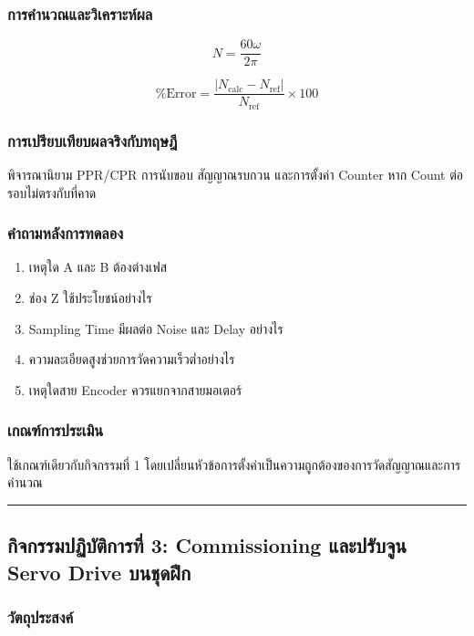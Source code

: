 \subsubsection{การคำนวณและวิเคราะห์ผล}

\[
N=\frac{60\omega}{2\pi}
\]

\[
\%\text{Error}
=
\frac{|N_{\text{calc}}-N_{\text{ref}}|}{N_{\text{ref}}}\times100
\]

\subsubsection{การเปรียบเทียบผลจริงกับทฤษฎี}

พิจารณานิยาม PPR/CPR การนับขอบ สัญญาณรบกวน และการตั้งค่า Counter หาก Count ต่อรอบไม่ตรงกับที่คาด

\subsubsection{คำถามหลังการทดลอง}

\begin{enumerate}
    \item เหตุใด A และ B ต้องต่างเฟส
    \item ช่อง Z ใช้ประโยชน์อย่างไร
    \item Sampling Time มีผลต่อ Noise และ Delay อย่างไร
    \item ความละเอียดสูงช่วยการวัดความเร็วต่ำอย่างไร
    \item เหตุใดสาย Encoder ควรแยกจากสายมอเตอร์
\end{enumerate}

\subsubsection{เกณฑ์การประเมิน}

ใช้เกณฑ์เดียวกับกิจกรรมที่ 1 โดยเปลี่ยนหัวข้อการตั้งค่าเป็นความถูกต้องของการวัดสัญญาณและการคำนวณ

\par\noindent\rule{\textwidth}{0.4pt}\par

\subsection{กิจกรรมปฏิบัติการที่ 3: Commissioning และปรับจูน Servo Drive บนชุดฝึก}

\subsubsection{วัตถุประสงค์}

